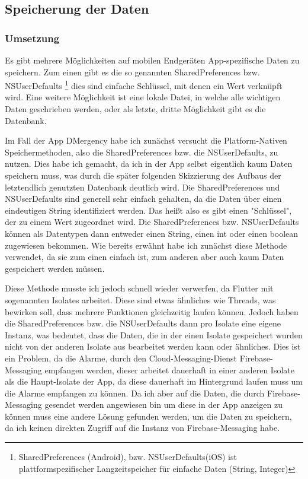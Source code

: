 \subsection{Speicherung der Daten}
\subsubsection{Umsetzung}
    Es gibt mehrere Möglichkeiten auf mobilen Endgeräten App-spezifische Daten zu speichern.
    Zum einen gibt es die so genannten SharedPreferences bzw. NSUserDefaults
    \footnote{SharedPreferences (Android), bzw. NSUserDefaults(iOS) ist plattformspezifischer 
    Langzeitspeicher für einfache Daten (String, Integer)} dies sind einfache Schlüssel, mit 
    denen ein Wert verknüpft wird. Eine weitere Möglichkeit ist eine lokale Datei, in welche 
    alle wichtigen Daten geschrieben werden, oder als letzte, dritte Möglichkeit gibt es
    die Datenbank.

    Im Fall der App DMergency habe ich zunächst versucht die Platform-Nativen Speichermethoden, 
    also die SharedPreferences bzw. die NSUserDefaults, zu nutzen. Dies habe ich gemacht, da ich 
    in der App selbst eigentlich kaum Daten speichern muss, was durch die später folgenden 
    Skizzierung des Aufbaus der letztendlich genutzten Datenbank deutlich wird. Die 
    SharedPreferences und NSUserDefaults sind generell sehr einfach gehalten, da die Daten über 
    einen eindeutigen String identifiziert werden. Das heißt also es gibt einen "Schlüssel", der 
    zu einem Wert zugeordnet wird. Die SharedPreferences bzw. NSUserDefaults können als 
    Datentypen dann entweder einen String, einen int oder einen boolean zugewiesen bekommen.
    Wie bereits erwähnt habe ich zunächst diese Methode verwendet, da sie zum einen einfach ist, 
    zum anderen aber auch kaum Daten gespeichert werden müssen.

    Diese Methode musste ich jedoch schnell wieder verwerfen, da Flutter mit sogenannten Isolates 
    arbeitet. Diese sind etwas ähnliches wie Threads, was bewirken soll, dass mehrere Funktionen 
    gleichzeitig laufen können. Jedoch haben die SharedPreferences bzw. die NSUserDefaults dann 
    pro Isolate eine eigene Instanz, was bedeutet, dass die Daten, die in der einen Isolate 
    gespeichert wurden nicht von der anderen Isolate aus bearbeitet werden kann oder ähnliches.
    Dies ist ein Problem, da die Alarme, durch den Cloud-Messaging-Dienst Firebase-Messaging 
    empfangen werden, dieser arbeitet dauerhaft in einer anderen Isolate als die Haupt-Isolate 
    der App, da diese dauerhaft im Hintergrund laufen muss um die Alarme empfangen zu können. 
    Da ich aber auf die Daten, die durch Firebase-Messaging gesendet werden angewiesen bin um 
    diese in der App anzeigen zu können muss eine andere Lösung gefunden werden, um die Daten 
    zu speichern, da ich keinen direkten Zugriff auf die Instanz von Firebase-Messaging habe.

